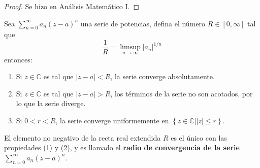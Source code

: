 \documentclass[12pt]{report}
\theoremstyle{largebreak}
\newcommand\abs[1]{\ensuremath{\left|#1\right|}}
\begin{document}
    \begin{proof}
        Se hizo en Análisis Matemático I.
    \end{proof}

    \begin{theor}
        Sea $\sum_{ n=0}^\infty a_n(z-a)^n$ una serie de potencias, defina el número $R\in[0,\infty]$ tal que
        \begin{equation*}
            \frac{1}{R}=\limsup_{ n\rightarrow\infty}\abs{a_n}^{ 1/n}
        \end{equation*}
        entonces:
        \begin{enumerate}
            \item Si $z\in\mathbb{C}$ es tal que $\abs{z-a}<R$, la serie converge absolutamente.
            \item Si $z\in\mathbb{C}$ es tal que $\abs{z-a}>R$, los términos de la serie no son acotados, por lo que la serie diverge.
            \item Si $0<r<R$, la serie converge uniformemente en $\left\{ z\in\mathbb{C}\Big|\abs{z}\leq r \right\}$.
        \end{enumerate}
        El elemento no negativo de la recta real extendida $R$ es el único con las propiedades (1) y (2), y es llamado el \textbf{radio de convergencia de la serie $\sum_{ n=0}^\infty a_n(z-a)^n$}.
    \end{theor}
\end{document}
